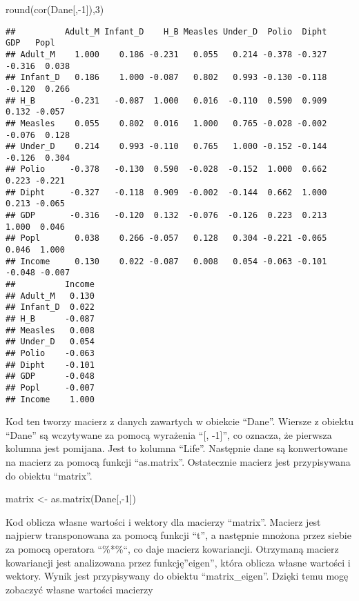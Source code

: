 \documentclass[
]{article}
\newenvironment{Shaded}{\begin{snugshade}}{\end{snugshade}}
\newcommand{\DecValTok}[1]{\textcolor[rgb]{0.00,0.00,0.81}{#1}}
\newcommand{\FunctionTok}[1]{\textcolor[rgb]{0.00,0.00,0.00}{#1}}
\newcommand{\NormalTok}[1]{#1}
\newcommand{\OtherTok}[1]{\textcolor[rgb]{0.56,0.35,0.01}{#1}}
\newcommand{\SpecialCharTok}[1]{\textcolor[rgb]{0.00,0.00,0.00}{#1}}
\begin{document}
\begin{Shaded}
\begin{Highlighting}[]
\FunctionTok{round}\NormalTok{(}\FunctionTok{cor}\NormalTok{(Dane[,}\SpecialCharTok{{-}}\DecValTok{1}\NormalTok{]),}\DecValTok{3}\NormalTok{)}
\end{Highlighting}
\end{Shaded}

\begin{verbatim}
##          Adult_M Infant_D    H_B Measles Under_D  Polio  Dipht    GDP   Popl
## Adult_M    1.000    0.186 -0.231   0.055   0.214 -0.378 -0.327 -0.316  0.038
## Infant_D   0.186    1.000 -0.087   0.802   0.993 -0.130 -0.118 -0.120  0.266
## H_B       -0.231   -0.087  1.000   0.016  -0.110  0.590  0.909  0.132 -0.057
## Measles    0.055    0.802  0.016   1.000   0.765 -0.028 -0.002 -0.076  0.128
## Under_D    0.214    0.993 -0.110   0.765   1.000 -0.152 -0.144 -0.126  0.304
## Polio     -0.378   -0.130  0.590  -0.028  -0.152  1.000  0.662  0.223 -0.221
## Dipht     -0.327   -0.118  0.909  -0.002  -0.144  0.662  1.000  0.213 -0.065
## GDP       -0.316   -0.120  0.132  -0.076  -0.126  0.223  0.213  1.000  0.046
## Popl       0.038    0.266 -0.057   0.128   0.304 -0.221 -0.065  0.046  1.000
## Income     0.130    0.022 -0.087   0.008   0.054 -0.063 -0.101 -0.048 -0.007
##          Income
## Adult_M   0.130
## Infant_D  0.022
## H_B      -0.087
## Measles   0.008
## Under_D   0.054
## Polio    -0.063
## Dipht    -0.101
## GDP      -0.048
## Popl     -0.007
## Income    1.000
\end{verbatim}

Kod ten tworzy macierz z danych zawartych w obiekcie ``Dane''. Wiersze z
obiektu ``Dane'' są wczytywane za pomocą wyrażenia ``{[}, -1{]}'', co
oznacza, że pierwsza kolumna jest pomijana. Jest to kolumna ``Life''.
Następnie dane są konwertowane na macierz za pomocą funkcji
``as.matrix''. Ostatecznie macierz jest przypisywana do obiektu
``matrix''.

\begin{Shaded}
\begin{Highlighting}[]
\NormalTok{matrix }\OtherTok{\textless{}{-}} \FunctionTok{as.matrix}\NormalTok{(Dane[,}\SpecialCharTok{{-}}\DecValTok{1}\NormalTok{])}
\end{Highlighting}
\end{Shaded}

Kod oblicza własne wartości i wektory dla macierzy ``matrix''. Macierz
jest najpierw transponowana za pomocą funkcji ``t'', a następnie mnożona
przez siebie za pomocą operatora ``\%*\%``, co daje macierz kowariancji.
Otrzymaną macierz kowariancji jest analizowana przez funkcję''eigen'',
która oblicza własne wartości i wektory. Wynik jest przypisywany do
obiektu ``matrix\_eigen''. Dzięki temu mogę zobaczyć własne wartości
macierzy
\end{document}
